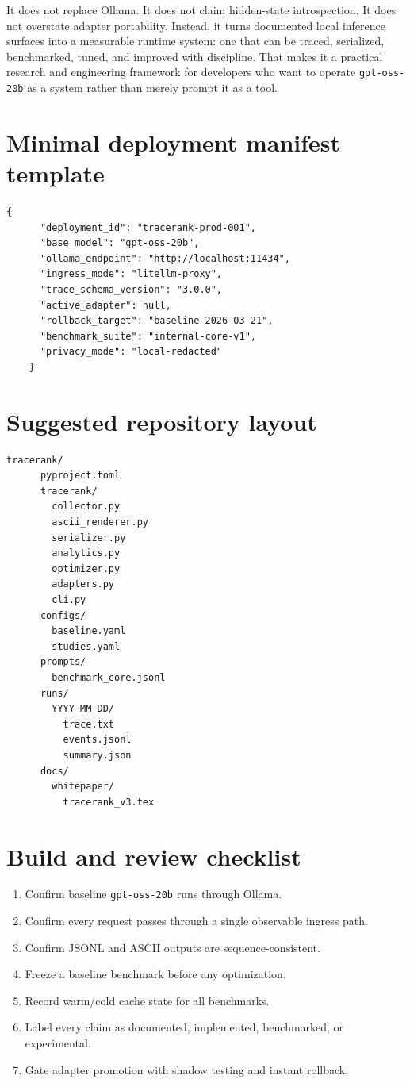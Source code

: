     It does not replace Ollama. It does not claim hidden-state introspection. It does not overstate adapter portability. Instead, it turns documented local inference surfaces into a measurable runtime system: one that can be traced, serialized, benchmarked, tuned, and improved with discipline. That makes it a practical research and engineering framework for developers who want to operate \texttt{gpt-oss-20b} as a system rather than merely prompt it as a tool.
    
    \appendix
    \section{Minimal deployment manifest template}
    \begin{lstlisting}[style=tracerank,caption={Illustrative deployment manifest.}]
    {
      "deployment_id": "tracerank-prod-001",
      "base_model": "gpt-oss-20b",
      "ollama_endpoint": "http://localhost:11434",
      "ingress_mode": "litellm-proxy",
      "trace_schema_version": "3.0.0",
      "active_adapter": null,
      "rollback_target": "baseline-2026-03-21",
      "benchmark_suite": "internal-core-v1",
      "privacy_mode": "local-redacted"
    }
    \end{lstlisting}
    
    \section{Suggested repository layout}
    \begin{lstlisting}[style=tracerank]
    tracerank/
      pyproject.toml
      tracerank/
        collector.py
        ascii_renderer.py
        serializer.py
        analytics.py
        optimizer.py
        adapters.py
        cli.py
      configs/
        baseline.yaml
        studies.yaml
      prompts/
        benchmark_core.jsonl
      runs/
        YYYY-MM-DD/
          trace.txt
          events.jsonl
          summary.json
      docs/
        whitepaper/
          tracerank_v3.tex
    \end{lstlisting}
    
    \section{Build and review checklist}
    \begin{enumerate}[label=\arabic*.]
      \item Confirm baseline \texttt{gpt-oss-20b} runs through Ollama.
      \item Confirm every request passes through a single observable ingress path.
      \item Confirm JSONL and ASCII outputs are sequence-consistent.
      \item Freeze a baseline benchmark before any optimization.
      \item Record warm/cold cache state for all benchmarks.
      \item Label every claim as documented, implemented, benchmarked, or experimental.
      \item Gate adapter promotion with shadow testing and instant rollback.
    \end{enumerate}
    
    \printbibliography
    
    